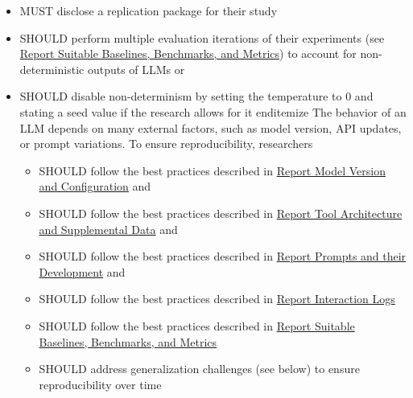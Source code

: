 \begin{itemize}
  \item MUST disclose a replication package for their study
  \item SHOULD perform multiple evaluation iterations of their experiments (see \href{/guidelines/report-baselines-benchmarks-and-metrics}{Report Suitable Baselines, Benchmarks, and Metrics}) to account for non-deterministic outputs of LLMs or
  \item SHOULD disable non-determinism by setting the temperature to 0 and stating a seed value if the research allows for it
end{itemize}
The behavior of an LLM depends on many external factors, such as model version, API updates, or prompt variations. To ensure reproducibility, researchers
\begin{itemize}
  \item SHOULD follow the best practices described in \href{/guidelines/report-version-and-configuration}{Report Model Version and Configuration} and
  \item SHOULD follow the best practices described in \href{/guidelines/report-architecture-and-data}{Report Tool Architecture and Supplemental Data} and
  \item SHOULD follow the best practices described in \href{/guidelines/report-prompts}{Report Prompts and their Development} and
  \item SHOULD follow the best practices described in \href{/guidelines/report-interaction-logs}{Report Interaction Logs}
  \item SHOULD follow the best practices described in \href{/guidelines/report-baselines-benchmarks-and-metrics}{Report Suitable Baselines, Benchmarks, and Metrics}
  \item SHOULD address generalization challenges (see below) to ensure reproducibility over time
\end{itemize}


\end{itemize}

